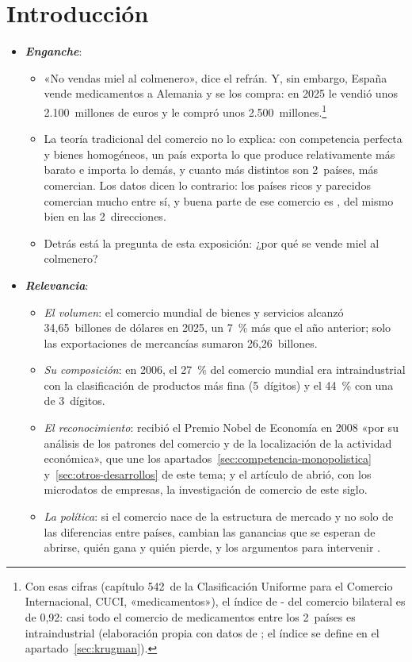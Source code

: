 \documentclass[11pt]{article}
\begin{document}
\tceetitulo

\section*{Introducción}

\begin{itemize}
\item \textbf{\emph{Enganche}}:
  \begin{itemize}
  \item «No vendas miel al colmenero», dice el refrán. Y, sin embargo, España vende medicamentos a Alemania y se los compra: en 2025 le vendió unos 2.100~millones de euros y le compró unos 2.500~millones\nocite{Eurostat2026Comext}.\footnote{Con esas cifras (capítulo 542~de la Clasificación Uniforme para el Comercio Internacional, CUCI, «medicamentos»), el índice de - del comercio bilateral es de 0,92: casi todo el comercio de medicamentos entre los 2~países es intraindustrial (elaboración propia con datos de \textcite{Eurostat2026Comext}; el índice se define en el apartado~\ref{sec:krugman}).}
  \item La teoría tradicional del comercio  no lo explica: con competencia perfecta y bienes homogéneos, un país exporta lo que produce relativamente más barato e importa lo demás, y cuanto más distintos son 2~países, más comercian. Los datos dicen lo contrario: los países ricos y parecidos comercian mucho entre sí, y buena parte de ese comercio es , del mismo bien en las 2~direcciones.
  \item Detrás está la pregunta de esta exposición: ¿por qué se vende miel al colmenero?
  \end{itemize}

\item \textbf{\emph{Relevancia}}:
  \begin{itemize}
  \item \emph{El volumen}: el comercio mundial de bienes y servicios alcanzó 34,65~billones de dólares en 2025, un 7~\% más que el año anterior; solo las exportaciones de mercancías sumaron 26,26~billones\nocite{OMC2026Perspectivas}.
  \item \emph{Su composición}: en 2006, el 27~\% del comercio mundial era intraindustrial con la clasificación de productos más fina (5~dígitos) y el 44~\% con una de 3~dígitos\nocite{Brulhart2009Account}.
  \item \emph{El reconocimiento}:  recibió el Premio Nobel de Economía en 2008 «por su análisis de los patrones del comercio y de la localización de la actividad económica»\nocite{Nobel2008Krugman}, que une los apartados~\ref{sec:competencia-monopolistica} y~\ref{sec:otros-desarrollos} de este tema; y el artículo de \textcite{Melitz2003Impact} abrió, con los microdatos de empresas, la investigación de comercio de este siglo.
  \item \emph{La política}: si el comercio nace de la estructura de mercado y no solo de las diferencias entre países, cambian las ganancias que se esperan de abrirse, quién gana y quién pierde, y los argumentos para intervenir .
  \end{itemize}


\end{itemize}
\end{document}
